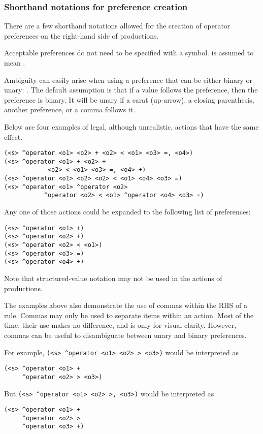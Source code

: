\subsubsection{Shorthand notations for preference creation}

There are a few shorthand notations allowed for the creation of operator
preferences on the right-hand side of productions.

Acceptable preferences do not need to be specified with a \soar{+}
symbol.  is assumed to mean .

Ambiguity can easily arise when using a preference that can be
either binary or unary: \soar{> < =}. The default assumption is that if a
value follows the preference, then the preference is binary. It will be unary
if a carat (up-arrow), a closing parenthesis, another preference, or a comma follows it. 

Below are four examples of legal, although unrealistic, actions that have the
same effect.

\begin{verbatim}
(<s> ^operator <o1> <o2> + <o2> < <o1> <o3> =, <o4>)
(<s> ^operator <o1> + <o2> + 
            <o2> < <o1> <o3> =, <o4> +)
(<s> ^operator <o1> <o2> <o2> < <o1> <o4> <o3> =)
(<s> ^operator <o1> ^operator <o2>
           ^operator <o2> < <o1> ^operator <o4> <o3> =)
\end{verbatim}

Any one of those actions could be expanded to the following list of
preferences: 
\begin{verbatim}
(<s> ^operator <o1> +)
(<s> ^operator <o2> +)
(<s> ^operator <o2> < <o1>)
(<s> ^operator <o3> =)
(<s> ^operator <o4> +)
\end{verbatim}

Note that structured-value notation may not be used in the actions of 
productions.

The examples above also demonstrate the use of commas within the RHS of a rule.
Commas may only be used to separate items within an action. Most of the time, their use makes no 
difference, and is only for visual clarity. However, commas can be useful to 
disambiguate between unary and binary preferences.

For example, \verb|(<s> ^operator <o1> <o2> > <o3>)| would be interpreted as
\begin{verbatim}
(<s> ^operator <o1> +
     ^operator <o2> > <o3>)
\end{verbatim}
But \verb|(<s> ^operator <o1> <o2> >, <o3>)| would be interpreted as
\begin{verbatim}
(<s> ^operator <o1> +
     ^operator <o2> >
     ^operator <o3> +)
\end{verbatim}


